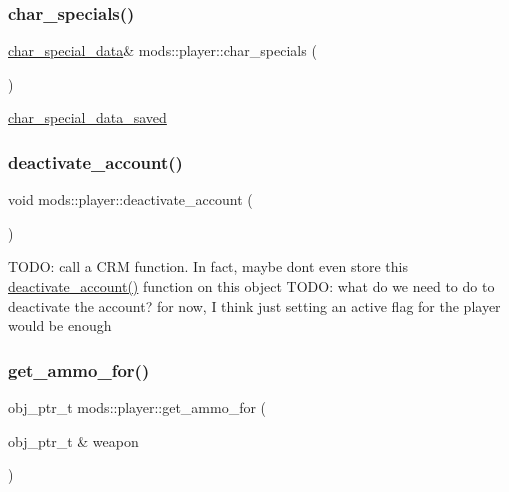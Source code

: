 \subsubsection{\texorpdfstring{char\+\_\+specials()}{char\_specials()}}
{\footnotesize\ttfamily \hyperlink{structchar__special__data}{char\+\_\+special\+\_\+data}\& mods\+::player\+::char\+\_\+specials (\begin{DoxyParamCaption}{ }\end{DoxyParamCaption})\hspace{0.3cm}{\ttfamily [inline]}}

\hyperlink{structchar__special__data__saved}{char\+\_\+special\+\_\+data\+\_\+saved} \mbox{\label{classmods_1_1player_abbbcc9a9d532b3fbfcd16faeb72e8a35}} 
\subsubsection{\texorpdfstring{deactivate\+\_\+account()}{deactivate\_account()}}
{\footnotesize\ttfamily void mods\+::player\+::deactivate\+\_\+account (\begin{DoxyParamCaption}{ }\end{DoxyParamCaption})}

T\+O\+DO\+: call a C\+RM function. In fact, maybe don\textquotesingle{}t even store this \hyperlink{classmods_1_1player_abbbcc9a9d532b3fbfcd16faeb72e8a35}{deactivate\+\_\+account()} function on this object T\+O\+DO\+: what do we need to do to deactivate the account? for now, I think just setting an active flag for the player would be enough\mbox{\label{classmods_1_1player_a0f650360e3abd409657d69aece464f9b}} 
\subsubsection{\texorpdfstring{get\+\_\+ammo\+\_\+for()}{get\_ammo\_for()}}
{\footnotesize\ttfamily obj\+\_\+ptr\+\_\+t mods\+::player\+::get\+\_\+ammo\+\_\+for (\begin{DoxyParamCaption}\item[{obj\+\_\+ptr\+\_\+t \&}]{weapon }\end{DoxyParamCaption})}


